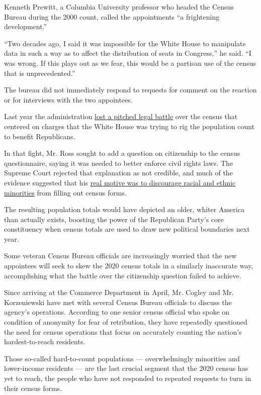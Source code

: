 Kenneth Prewitt, a Columbia University professor who headed the Census
Bureau during the 2000 count, called the appointments ``a frightening
development.''

``Two decades ago, I said it was impossible for the White House to
manipulate data in such a way as to affect the distribution of seats in
Congress,'' he said. ``I was wrong. If this plays out as we fear, this
would be a partisan use of the census that is unprecedented.''

The bureau did not immediately respond to requests for comment on the
reaction or for interviews with the two appointees.

Last year the administration
\href{https://www.nytimes3xbfgragh.onion/2019/07/02/us/trump-census-citizenship-question.html}{lost
a pitched legal battle} over the census that centered on charges that
the White House was trying to rig the population count to benefit
Republicans.

In that fight, Mr. Ross sought to add a question on citizenship to the
census questionnaire, saying it was needed to better enforce civil
rights laws. The Supreme Court rejected that explanation as not
credible, and much of the evidence suggested that his
\href{https://www.nytimes3xbfgragh.onion/2019/05/30/us/census-citizenship-question-hofeller.html}{real
motive was to discourage racial and ethnic minorities} from filling out
census forms.

The resulting population totals would have depicted an older, whiter
America than actually exists, boosting the power of the Republican
Party's core constituency when census totals are used to draw new
political boundaries next year.

Some veteran Census Bureau officials are increasingly worried that the
new appointees will seek to skew the 2020 census totals in a similarly
inaccurate way, accomplishing what the battle over the citizenship
question failed to achieve.

Since arriving at the Commerce Department in April, Mr. Cogley and Mr.
Korzeniewski have met with several Census Bureau officials to discuss
the agency's operations. According to one senior census official who
spoke on condition of anonymity for fear of retribution, they have
repeatedly questioned the need for census operations that focus on
accurately counting the nation's hardest-to-reach residents.

Those so-called hard-to-count populations --- overwhelmingly minorities
and lower-income residents --- are the last crucial segment that the
2020 census has yet to reach, the people who have not responded to
repeated requests to turn in their census forms.

